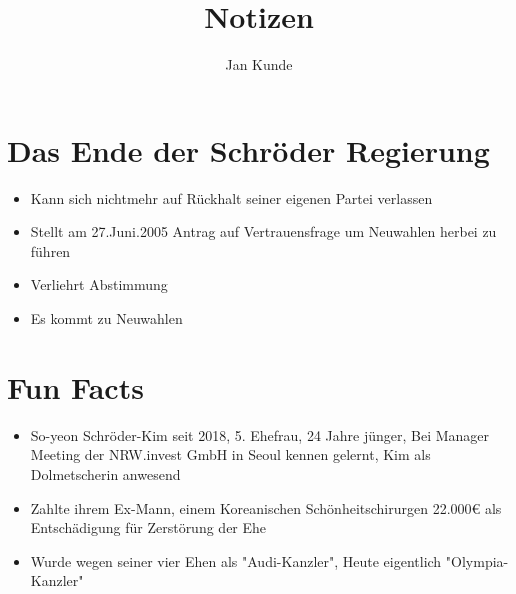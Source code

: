 \documentclass[14pt]{article}
\title{Notizen}
\author{Jan Kunde}
\date{}
\begin{document}
    \maketitle
    
    \section{Das Ende der Schröder Regierung}
        \begin{itemize}
            \item Kann sich nichtmehr auf Rückhalt seiner eigenen Partei verlassen
            \item Stellt am 27.Juni.2005 Antrag auf Vertrauensfrage um Neuwahlen herbei zu führen
            \item Verliehrt Abstimmung
            \item Es kommt zu Neuwahlen
        \end{itemize}

    \section{Fun Facts}
        \begin{itemize}
            \item So-yeon Schröder-Kim seit 2018, 5. Ehefrau, 24 Jahre jünger, Bei Manager Meeting der NRW.invest GmbH in Seoul kennen gelernt, Kim als Dolmetscherin anwesend
            \item Zahlte ihrem Ex-Mann, einem Koreanischen Schönheitschirurgen 22.000€ als Entschädigung für Zerstörung der Ehe 
            \item Wurde wegen seiner vier Ehen als "Audi-Kanzler", Heute eigentlich "Olympia-Kanzler"
        \end{itemize}
\end{document}
